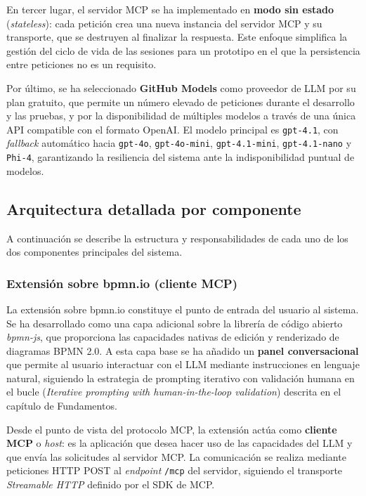 En tercer lugar, el servidor MCP se ha implementado en \textbf{modo sin estado} (\textit{stateless}): cada petición crea una nueva instancia del servidor MCP y su transporte, que se destruyen al finalizar la respuesta. Este enfoque simplifica la gestión del ciclo de vida de las sesiones para un prototipo en el que la persistencia entre peticiones no es un requisito.

Por último, se ha seleccionado \textbf{GitHub Models} como proveedor de LLM por su plan gratuito, que permite un número elevado de peticiones durante el desarrollo y las pruebas, y por la disponibilidad de múltiples modelos a través de una única API compatible con el formato OpenAI. El modelo principal es \texttt{gpt-4.1}, con \textit{fallback} automático hacia \texttt{gpt-4o}, \texttt{gpt-4o-mini}, \texttt{gpt-4.1-mini}, \texttt{gpt-4.1-nano} y \texttt{Phi-4}, garantizando la resiliencia del sistema ante la indisponibilidad puntual de modelos.

\subsection{Arquitectura detallada por componente}

A continuación se describe la estructura y responsabilidades de cada uno de los dos componentes principales del sistema.

\subsubsection{Extensión sobre bpmn.io (cliente MCP)}

La extensión sobre bpmn.io constituye el punto de entrada del usuario al sistema. Se ha desarrollado como una capa adicional sobre la librería de código abierto \textit{bpmn-js}, que proporciona las capacidades nativas de edición y renderizado de diagramas BPMN 2.0. A esta capa base se ha añadido un \textbf{panel conversacional} que permite al usuario interactuar con el LLM mediante instrucciones en lenguaje natural, siguiendo la estrategia de prompting iterativo con validación humana en el bucle (\textit{Iterative prompting with human-in-the-loop validation}) descrita en el capítulo de Fundamentos.

Desde el punto de vista del protocolo MCP, la extensión actúa como \textbf{cliente MCP} o \textit{host}: es la aplicación que desea hacer uso de las capacidades del LLM y que envía las solicitudes al servidor MCP. La comunicación se realiza mediante peticiones HTTP POST al \textit{endpoint} \texttt{/mcp} del servidor, siguiendo el transporte \textit{Streamable HTTP} definido por el SDK de MCP.

